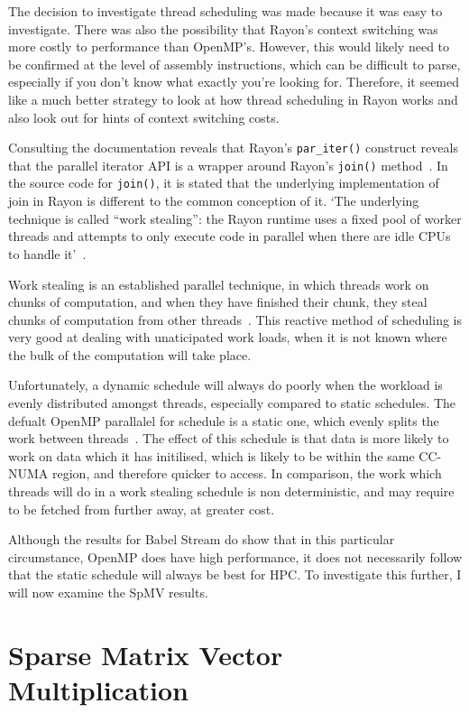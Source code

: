 The decision to investigate thread scheduling was made because it was easy to investigate. There was also the possibility that Rayon's context switching was more costly to performance than OpenMP's. However, this would likely need to be confirmed at the level of assembly instructions, which can be difficult to parse, especially if you don't know what exactly you're looking for. Therefore, it seemed like a much better strategy to look at how thread scheduling in Rayon works  and also look out for hints of context switching costs.

Consulting the documentation reveals that Rayon's \texttt{par\_iter()} construct reveals that the parallel iterator API is a wrapper around Rayon's \texttt{join()} method~\cite{smallCult}. In the source code for \texttt{join()}, it is stated that the underlying implementation of join in Rayon is different to the common conception of it. 
`The underlying technique is called ``work stealing'': the
Rayon runtime uses a fixed pool of worker threads and attempts to only execute code in parallel when there are idle CPUs to handle it'~\cite{joinSrc}.

Work stealing is an established parallel technique, in which threads work on chunks of computation, and when they have finished their chunk, they steal chunks of computation from other threads~\cite{blumofe1999}. This reactive method of scheduling is very good at dealing with unaticipated work loads, when it is not known where the bulk of the computation will take place.

Unfortunately, a dynamic schedule will always do poorly when the workload is evenly distributed amongst threads, especially compared to static schedules. The defualt OpenMP parallalel for schedule is a static one, which evenly splits the work between threads~\cite{OpenMPSpec5}. The effect of this schedule is that data is more likely to work on data which it has initilised, which is likely to be within the same CC-NUMA region, and therefore quicker to access. In comparison, the work which threads will do in a work stealing schedule is non deterministic, and may require to be fetched from further away, at greater cost.

Although the results for Babel Stream do show that in this particular circumstance, OpenMP does have high performance, it does not necessarily follow that the static schedule will always be best for HPC. To investigate this further, I will now examine the SpMV results.
\section{Sparse Matrix Vector Multiplication}\label{sec:res-sparse}
